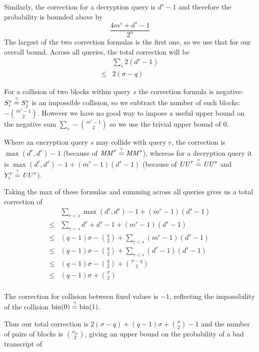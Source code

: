\documentclass[hctr.tex]{subfiles}
\begin{document}
Similarly, the correction for a decryption query is
\(d^s - 1\) and therefore  the probability 
is bounded above by
\begin{displaymath}
    \frac{4m^s + d^s -1}{2^n}
\end{displaymath}
The largest of the two correction formulas is
the first one, so we use that for our overall bound.
Across all queries, the total
correction will be
\begin{align*}
    &\sum_s 2(d^s - 1) \\
    \leq & 2(\sigma - q)
\end{align*}

For a collision of two blocks within query \(s\)
the correction formula is negative:
\(S_i^s \stackrel{\text{?}}{=} S_j^s\) is an impossible collision, 
so we subtract the number of such blocks:
\(-\binom{m^s -1}{2}\). However we have no good way
to impose a useful upper bound on the negative sum
\(\sum_s-\binom{m^s -1}{2}\) so we use the
trivial upper bound of 0.

Where an encryption query \(s\)
may collide with query \(r\), the correction is 
\(\max(d^r, d^s) -1\)
(because of \(\mathit{MM}^r \stackrel{\text{?}}{=} \mathit{MM}^s\)), whereas for a decryption query
it is \(\max(d^r, d^s) -1 + (m^r -1 )(d^s -1)\)
(because of \(\mathit{UU}^r \stackrel{\text{?}}{=} \mathit{UU}^s\) and \(Y_i^r \stackrel{\text{?}}{=} \mathit{UU}^s\)).

Taking the max of these formulas and summing across
all queries gives us a total correction of
\begin{align*}
    &\sum_{r < s} \max(d^r, d^s) -1 + (m^r -1 )(d^s -1)\\
    \leq & \sum_{r < s} d^r + d^s -1 + (m^r -1 )(d^s -1)\\
    \leq & (q-1)\sigma - \binom{q}{2} + \sum_{r < s} (m^r -1 )(d^s -1) \\
    \leq & (q-1)\sigma - \binom{q}{2} + \sum_{r < s} (d^r -1)(d^s -1) \\
    \leq & (q-1)\sigma - \binom{q}{2} + \binom{\sigma - q}{2} \\
   \leq & (q-1)\sigma + \binom{\sigma}{2} \\
\end{align*}

The correction for collision between fixed values
is \(-1\), reflecting the impossibility of the collision
\(\operatorname{bin}(0) \stackrel{\text{?}}{=} \operatorname{bin}(1)\).

Thus our total correction is
\(2(\sigma - q) + (q-1)\sigma + \binom{\sigma}{2} -1\)
and the number of pairs of blocks is \(\binom{\sigma_m}{2}\), 
giving an upper bound
on the probability of a bad transcript of
\end{document}
